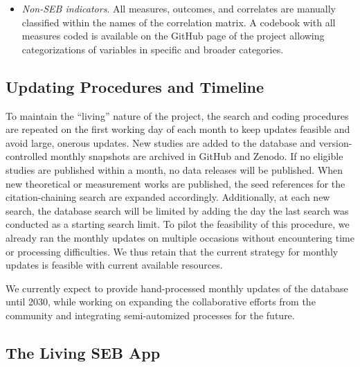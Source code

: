 \documentclass[
  man,
  longtable,
  nolmodern,
  notxfonts,
  notimes,
  colorlinks=true,linkcolor=blue,citecolor=blue,urlcolor=blue]{apa7}
\begin{document}
\begin{itemize}
  \emph{Effect sizes}: The entire Pearson's correlations matrices among
  all study variables are extracted from the papers as measure of effect
  size. For papers including repeated measurements on the same sample
  (e.g., longitudinal studies, intervention studies with pre/post
  assessment), the correlations matrix is extracted only from the first
  data collection.
\item
  \emph{Non-SEB indicators}. All measures, outcomes, and correlates are
  manually classified within the names of the correlation matrix. A
  codebook with all measures coded is available on the GitHub page of
  the project allowing categorizations of variables in specific and
  broader categories.
\end{itemize}

\subsection{Updating Procedures and
Timeline}\label{updating-procedures-and-timeline}

To maintain the ``living'' nature of the project, the search and coding
procedures are repeated on the first working day of each month to keep
updates feasible and avoid large, onerous updates. New studies are added
to the database and version-controlled monthly snapshots are archived in
GitHub and Zenodo. If no eligible studies are published within a month,
no data releases will be published. When new theoretical or measurement
works are published, the seed references for the citation-chaining
search are expanded accordingly. Additionally, at each new search, the
database search will be limited by adding the day the last search was
conducted as a starting search limit. To pilot the feasibility of this
procedure, we already ran the monthly updates on multiple occasions
without encountering time or processing difficulties. We thus retain
that the current strategy for monthly updates is feasible with current
available resources.

We currently expect to provide hand-processed monthly updates of the
database until 2030, while working on expanding the collaborative
efforts from the community and integrating semi-automized processes for
the future.

\subsection{The Living SEB App}\label{the-living-seb-app}
\end{document}

